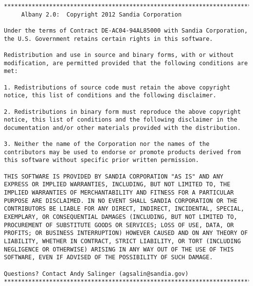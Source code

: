 \documentclass[pdf,12pt,report,strict]{SANDreport}
\theoremstyle{remark}
\begin{document}
\begin{verbatim}
************************************************************************
     Albany 2.0:  Copyright 2012 Sandia Corporation

Under the terms of Contract DE-AC04-94AL85000 with Sandia Corporation,
the U.S. Government retains certain rights in this software.

Redistribution and use in source and binary forms, with or without
modification, are permitted provided that the following conditions are
met:

1. Redistributions of source code must retain the above copyright
notice, this list of conditions and the following disclaimer.

2. Redistributions in binary form must reproduce the above copyright
notice, this list of conditions and the following disclaimer in the
documentation and/or other materials provided with the distribution.

3. Neither the name of the Corporation nor the names of the
contributors may be used to endorse or promote products derived from
this software without specific prior written permission.

THIS SOFTWARE IS PROVIDED BY SANDIA CORPORATION "AS IS" AND ANY
EXPRESS OR IMPLIED WARRANTIES, INCLUDING, BUT NOT LIMITED TO, THE
IMPLIED WARRANTIES OF MERCHANTABILITY AND FITNESS FOR A PARTICULAR
PURPOSE ARE DISCLAIMED. IN NO EVENT SHALL SANDIA CORPORATION OR THE
CONTRIBUTORS BE LIABLE FOR ANY DIRECT, INDIRECT, INCIDENTAL, SPECIAL,
EXEMPLARY, OR CONSEQUENTIAL DAMAGES (INCLUDING, BUT NOT LIMITED TO,
PROCUREMENT OF SUBSTITUTE GOODS OR SERVICES; LOSS OF USE, DATA, OR
PROFITS; OR BUSINESS INTERRUPTION) HOWEVER CAUSED AND ON ANY THEORY OF
LIABILITY, WHETHER IN CONTRACT, STRICT LIABILITY, OR TORT (INCLUDING
NEGLIGENCE OR OTHERWISE) ARISING IN ANY WAY OUT OF THE USE OF THIS
SOFTWARE, EVEN IF ADVISED OF THE POSSIBILITY OF SUCH DAMAGE.

Questions? Contact Andy Salinger (agsalin@sandia.gov)
************************************************************************
\end{verbatim}

%
\clearpage
\providecommand*{\phantomsection}{}
\phantomsection
{}


\end{document}
